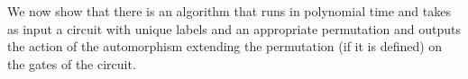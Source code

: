 \documentclass[../paper.tex]{subfiles}
\begin{document}
We now show that there is an algorithm that runs in polynomial time and takes as
input a circuit with unique labels and an appropriate permutation and outputs
the action of the automorphism extending the permutation (if it is defined) on the
gates of the circuit.


  

\end{document}
